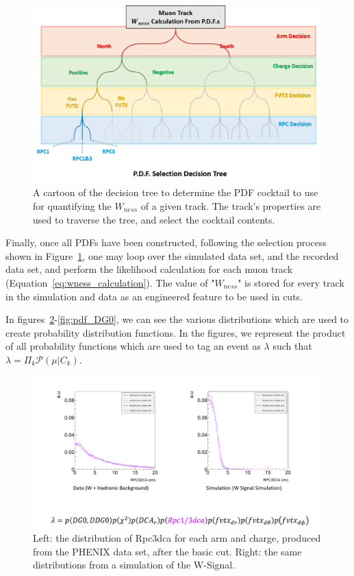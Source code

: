 \begin{figure}[ht]
  \centering
  \includegraphics[width=\linewidth,trim=4 4 4 4,clip]{./figures/pdf_selection_tree.png}
  \caption{
    A cartoon of the decision tree to determine the PDF cocktail to use for
    quantifying the $W_{ness}$ of a given track. The track's properties are used
    to traverse the tree, and select the cocktail contents.
  }
  \label{fig:pdf_selection_tree}
\end{figure}

Finally, once all PDFs have been constructed, following the selection process
shown in Figure~\ref{fig:pdf_selection_tree}, one may loop over the simulated
data set, and the recorded data set, and perform the likelihood calculation for
each muon track (Equation~\ref{eq:wness_calculation}). The value of
"$W_{ness}$" is stored for every track in the simulation and data as an
engineered feature to be used in cuts.

In figures~\ref{fig:pdf_rpc3dca}-\ref{fig:pdf_DG0}, we can see the various
distributions which are used to create probability distribution functions. In
the figures, we represent the product of all probability functions which are
used to tag an event as $\lambda$ such that 
$\lambda = \Pi_{k} \mathcal{P}(\mu \vert C_k)$.

\begin{figure}
  \centering
  \includegraphics[width=\linewidth,trim=4 4 4 4,clip]{./figures/pdf_rpc3dca.png}
  \caption{
    Left: the distribution of Rpc3dca for each arm and charge, produced from the
    PHENIX data set, after the basic cut. Right: the same distributions from a
    simulation of the W-Signal.
  }
  \label{fig:pdf_rpc3dca}
\end{figure}

